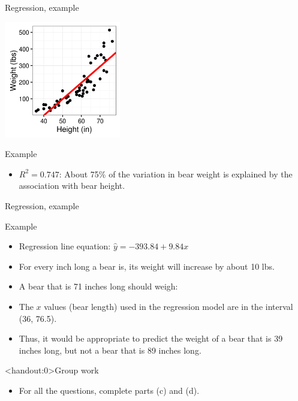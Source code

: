 \documentclass[xcolor=table, aspectratio=169, bigger, handout]{beamer}
\begin{document}
\begin{frame}{Regression, example}

\smallskip
{\centering
\includegraphics[width=2in]{../images/ch10_reg_bears}
\par}

\pause
\begin{exampleblock}{Example}
\begin{itemize}
\item $R^2 = 0.747$: About 75\% of the variation in bear weight is explained by the association with bear height.
\end{itemize}
\end{exampleblock}

\end{frame}

\begin{frame}{Regression, example}
\begin{exampleblock}{Example}
\begin{itemize}
\item Regression line equation: $\hat y = -393.84 + 9.84 x$
\pause\item For every inch long a bear is, its weight will increase by about 10 lbs.
\pause\item A bear that is 71 inches long should weigh: \\
\pause\item The $x$ values (bear length) used in the regression model are in the interval (36, 76.5). 
\pause\item Thus, it would be appropriate to predict the weight of a bear that is 39 inches long, but not a bear that is 89 inches long.
\end{itemize}
\end{exampleblock}

\end{frame}

\begin{frame}<handout:0>{Group work}
\begin{block}{}
\begin{itemize}
\item For all the questions, complete parts (c) and (d).
\end{itemize}
\end{block}
\end{frame}
\end{document}
